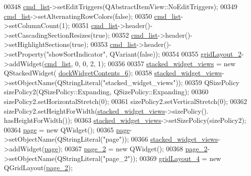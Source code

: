 \begin{DoxyCode}
00348         \hyperlink{a00027_aa66ece71395b435e915d384fb63bac1d}{cmd\_list}->setEditTriggers(QAbstractItemView::NoEditTriggers);
00349         \hyperlink{a00027_aa66ece71395b435e915d384fb63bac1d}{cmd\_list}->setAlternatingRowColors(\textcolor{keyword}{false});
00350         \hyperlink{a00027_aa66ece71395b435e915d384fb63bac1d}{cmd\_list}->setColumnCount(1);
00351         \hyperlink{a00027_aa66ece71395b435e915d384fb63bac1d}{cmd\_list}->header()->setCascadingSectionResizes(\textcolor{keyword}{true});
00352         \hyperlink{a00027_aa66ece71395b435e915d384fb63bac1d}{cmd\_list}->header()->setHighlightSections(\textcolor{keyword}{true});
00353         \hyperlink{a00027_aa66ece71395b435e915d384fb63bac1d}{cmd\_list}->header()->setProperty(\textcolor{stringliteral}{"showSortIndicator"}, QVariant(\textcolor{keyword}{false}));
00354 
00355         \hyperlink{a00027_a6b2a0c5f7e8ff2a87134908dd770d2d2}{gridLayout\_2}->addWidget(\hyperlink{a00027_aa66ece71395b435e915d384fb63bac1d}{cmd\_list}, 0, 0, 2, 1);
00356 
00357         \hyperlink{a00027_a59e39bd3d716004e840a5be5dda18b96}{stacked\_widget\_views} = \textcolor{keyword}{new} QStackedWidget(
      \hyperlink{a00027_a23b450a9debad2b0fecc6f063772caf2}{dockWidgetContents\_6});
00358         \hyperlink{a00027_a59e39bd3d716004e840a5be5dda18b96}{stacked\_widget\_views}->setObjectName(QStringLiteral(\textcolor{stringliteral}{"stacked\_widget\_views"}));
00359         QSizePolicy sizePolicy2(QSizePolicy::Expanding, QSizePolicy::Expanding);
00360         sizePolicy2.setHorizontalStretch(0);
00361         sizePolicy2.setVerticalStretch(0);
00362         sizePolicy2.setHeightForWidth(\hyperlink{a00027_a59e39bd3d716004e840a5be5dda18b96}{stacked\_widget\_views}->sizePolicy().
      hasHeightForWidth());
00363         \hyperlink{a00027_a59e39bd3d716004e840a5be5dda18b96}{stacked\_widget\_views}->setSizePolicy(sizePolicy2);
00364         \hyperlink{a00027_ad7d164376bef8649ee1f94697b859417}{page} = \textcolor{keyword}{new} QWidget();
00365         \hyperlink{a00027_ad7d164376bef8649ee1f94697b859417}{page}->setObjectName(QStringLiteral(\textcolor{stringliteral}{"page"}));
00366         \hyperlink{a00027_a59e39bd3d716004e840a5be5dda18b96}{stacked\_widget\_views}->addWidget(\hyperlink{a00027_ad7d164376bef8649ee1f94697b859417}{page});
00367         \hyperlink{a00027_adcb6de4cebc6760fe319711f125010cc}{page\_2} = \textcolor{keyword}{new} QWidget();
00368         \hyperlink{a00027_adcb6de4cebc6760fe319711f125010cc}{page\_2}->setObjectName(QStringLiteral(\textcolor{stringliteral}{"page\_2"}));
00369         \hyperlink{a00027_a8ee86315639f324b17708efc7dbe8b19}{gridLayout\_4} = \textcolor{keyword}{new} QGridLayout(\hyperlink{a00027_adcb6de4cebc6760fe319711f125010cc}{page\_2});

\end{DoxyCode}
